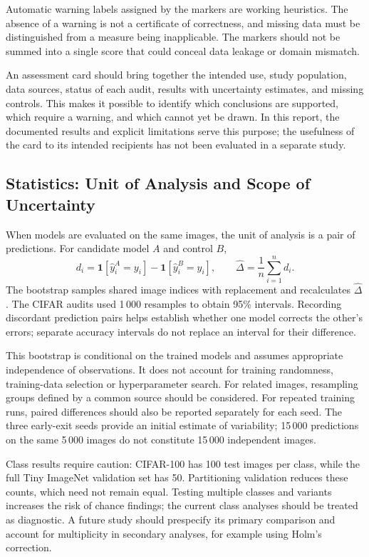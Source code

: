 \documentclass[12pt,a4paper]{article}
\begin{document}
Automatic warning labels assigned by the markers are working heuristics.
The absence of a warning is not a certificate of correctness, and missing
data must be distinguished from a measure being inapplicable.
The markers should not be summed into a single score that could conceal
data leakage or domain mismatch.

An assessment card should bring together the intended use, study population,
data sources, status of each audit, results with uncertainty estimates,
and missing controls. This makes it possible to identify which conclusions
are supported, which require a warning, and which cannot yet be drawn.
In this report, the documented results and explicit limitations serve
this purpose; the usefulness of the card to its intended recipients
has not been evaluated in a separate study.

\subsection{Statistics: Unit of Analysis and Scope of Uncertainty}

When models are evaluated on the same images, the unit of analysis is
a pair of predictions. For candidate model $A$ and control $B$,
\begin{equation}
d_i=\mathbf{1}[\hat y_i^A=y_i]-\mathbf{1}[\hat y_i^B=y_i],
\qquad \widehat{\Delta}=\frac{1}{n}\sum_{i=1}^{n}d_i.
\end{equation}
The bootstrap samples shared image indices with replacement and
recalculates $\widehat{\Delta}$.
The CIFAR audits used 1\,000 resamples to obtain 95\% intervals.
Recording discordant prediction pairs helps establish whether one model
corrects the other's errors; separate accuracy intervals do not replace
an interval for their difference.

This bootstrap is conditional on the trained models and assumes
appropriate independence of observations.
It does not account for training randomness, training-data selection
or hyperparameter search.
For related images, resampling groups defined by a common source should
be considered. For repeated training runs, paired differences should
also be reported separately for each seed.
The three early-exit seeds provide an initial estimate of variability;
15\,000 predictions on the same 5\,000 images do not constitute
15\,000 independent images.

Class results require caution: CIFAR-100 has 100 test images per class,
while the full Tiny ImageNet validation set has 50.
Partitioning validation reduces these counts, which need not remain equal.
Testing multiple classes and variants increases the risk of chance
findings; the current class analyses should be treated as diagnostic.
A future study should prespecify its primary comparison and account
for multiplicity in secondary analyses, for example using Holm's correction.
\end{document}
